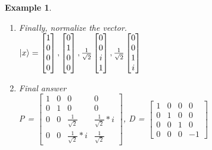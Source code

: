 \documentclass[12pt]{article}
\theoremstyle{plain}
\theoremstyle{nonumberplain}
\theoremstyle{plain}
\newtheorem{example}[lemma]{Example}
\theoremstyle{nonumberplain}
\newcommand\1{{\bf 1}}
\newcommand{\bmat}[1]{\begin{bmatrix*} #1 \end{bmatrix*}} %
\newcommand{\<}{\left\langle}
\renewcommand{\>}{\right\rangle}
\begin{document}
\begin{example}
\begin{enumerate}
\begin{equation}
\begin{split}
&\text{Now we must use this and transfer it into an equation to solve for } x_3,\; x_4\\
&x_3 = ix_4\\
&\text{Choose } x_4 = 1\\
&\ket{x} = \bmat{1 \\0 \\0 \\0},\bmat{0 \\1 \\0 \\0}, \bmat{0\\ 0\\ i\\ 1}, \bmat{0\\ 0\\ 1\\ i}\\
\end{split}
\end{equation}
These first two arrays are just chosen because there are no $x_1, x_2$ values in the eigenvector array, so we choose two unit vectors.
\item Finally, normalize the vector.\\
$\ket{x} = \bmat{1 \\0 \\0 \\0},\bmat{0 \\1 \\0 \\0}, \frac{1}{\sqrt{2}}\bmat{0\\ 0\\ i\\ 1}, \frac{1}{\sqrt{2}}\bmat{0\\ 0\\ 1\\ i}$\\
\item Final answer\\
P = $\bmat{1 &0 &0 &0\\ 0 &1 &0 &0\\ 0 &0 &\frac{1}{\sqrt{2}} &\frac{1}{\sqrt{2}}*i\\ 0 &0 &\frac{1}{\sqrt{2}}*i &\frac{1}{\sqrt{2}}}$, D = $\bmat{1 &0 &0 &0\\ 0 &1 &0 &0\\ 0 &0 &1 &0\\ 0 &0 &0 &-1}$
\end{enumerate}
\end{example}

\pagebreak
\end{document}
